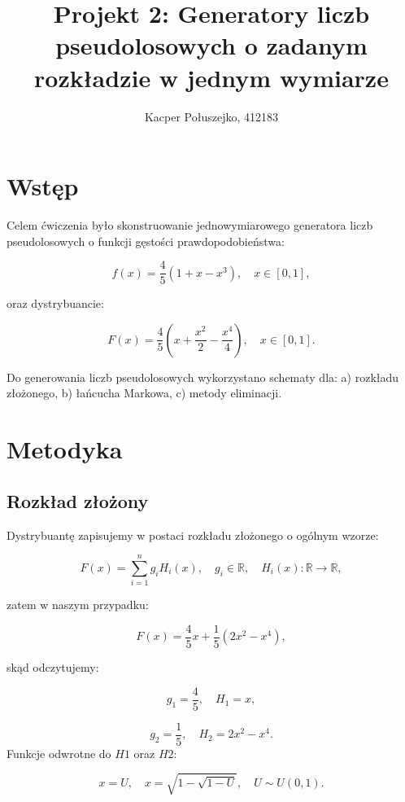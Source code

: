 \documentclass[a4paper,12pt,twoside]{article}
\title{\textbf{Projekt 2: Generatory liczb pseudolosowych o zadanym rozkładzie w jednym
 wymiarze}}
\author{Kacper Połuszejko, 412183}
\date{}
\begin{document}
\maketitle

\section*{Wstęp}

Celem ćwiczenia było skonstruowanie jednowymiarowego generatora liczb pseudolosowych o funkcji gęstości prawdopodobieństwa:

\begin{equation}
    f(x) = \frac{4}{5}(1+x-x^3), \quad x \in [0,1],
\end{equation}

oraz dystrybuancie:

\begin{equation}
  F(x) = \frac{4}{5}(x + \frac{x^2}{2} - \frac{x^4}{4}),   \quad x \in [0,1].
\end{equation}

 Do generowania liczb pseudolosowych wykorzystano schematy dla: a) rozkładu złożonego, b) łańcucha Markowa, c) metody eliminacji.

 \section{Metodyka}

\subsection{Rozkład złożony}

Dystrybuantę zapisujemy w postaci rozkładu złożonego o ogólnym wzorze:
    
\begin{equation}
    F(x) = \sum_{i=1}^n g_i H_i(x), \quad g_i \in \mathbb{R}, \quad H_i(x) : \mathbb{R} \rightarrow \mathbb{R},
\end{equation}

zatem w naszym przypadku:

\[
F(x) = \frac{4}{5}x + \frac{1}{5}\left(2x^2 - x^4\right),
\]

skąd odczytujemy:

\[
g_1 = \frac{4}{5}, \quad H_1 = x,
\]

\[
g_2 = \frac{1}{5}, \quad H_2 = 2x^2 - x^4.
\]
Funkcje odwrotne do $H1$ oraz $H2$:

\begin{equation}
    x = U, \quad x = \sqrt{1 - \sqrt{1 - U}}, \quad U \sim U(0, 1).
\end{equation}
\end{document}
